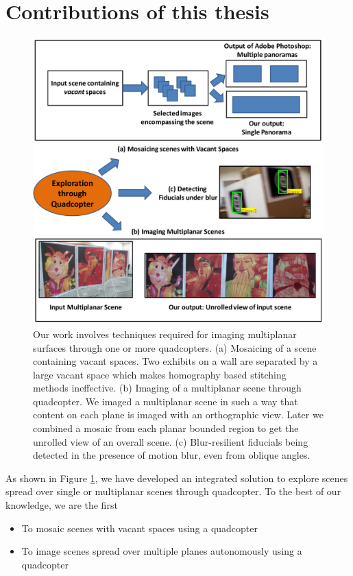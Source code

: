 \begin{itemize}
\end{itemize}

\section{Contributions of this thesis}
\begin{figure}[h!]
\centering
\includegraphics[width=0.98\linewidth]{figures/contributions2}
\caption[Contributions]{Our work involves techniques required for imaging
multiplanar surfaces through one or more quadcopters. (a) Mosaicing of a scene containing
vacant spaces. Two exhibits on a wall are separated by  a large vacant space
which makes homography based stitching methods ineffective. (b) Imaging
of a multiplanar scene through quadcopter. We imaged a multiplanar scene in such
a way that content on each plane is imaged with an orthographic view. Later we
combined a mosaic from each planar bounded region to get the  unrolled view of
an overall scene. (c) Blur-resilient fiducials being detected in the
presence of motion blur, even from oblique angles.}
\label{fig:contributions}
\end{figure}

As shown in Figure \ref{fig:contributions}, we have developed an integrated solution to
explore scenes spread over single or multiplanar scenes through quadcopter. To
the best of our knowledge, we are the first 
\begin{itemize}
  \item To mosaic scenes with vacant spaces using a quadcopter  
  \item To image scenes spread over multiple planes autonomously using a quadcopter  
\end{itemize}

